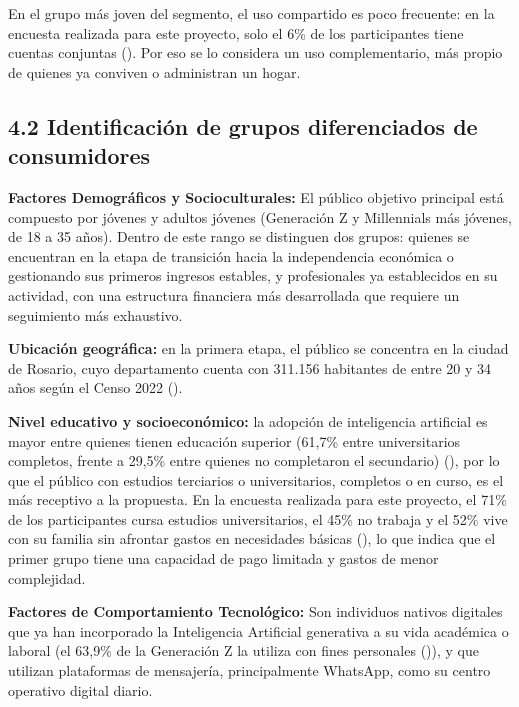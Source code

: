 En el grupo más joven del segmento, el uso compartido es poco frecuente:
en la encuesta realizada para este proyecto, solo el 6\% de los
participantes tiene cuentas conjuntas
(). Por eso se lo
considera un uso complementario, más propio de quienes ya conviven o
administran un hogar.

\subsection*{4.2 Identificación de grupos diferenciados de
consumidores}\label{identificaciuxf3n-de-grupos-diferenciados-de-consumidores}

\textbf{Factores Demográficos y Socioculturales:} El público objetivo
principal está compuesto por jóvenes y adultos jóvenes (Generación Z y
Millennials más jóvenes, de 18 a 35 años). Dentro de este rango se
distinguen dos grupos: quienes se encuentran en la etapa de transición
hacia la independencia económica o gestionando sus primeros ingresos
estables, y profesionales ya establecidos en su actividad, con una
estructura financiera más desarrollada que requiere un seguimiento más
exhaustivo.

\textbf{Ubicación geográfica:} en la primera etapa, el público se
concentra en la ciudad de Rosario, cuyo departamento cuenta con 311.156
habitantes de entre 20 y 34 años según el Censo 2022
().

\textbf{Nivel educativo y socioeconómico:} la adopción de inteligencia
artificial es mayor entre quienes tienen educación superior (61,7\%
entre universitarios completos, frente a 29,5\% entre quienes no
completaron el secundario) (), por lo que el público con estudios terciarios
o universitarios, completos o en curso, es el más receptivo a la
propuesta. En la encuesta realizada para este proyecto, el 71\% de los
participantes cursa estudios universitarios, el 45\% no trabaja y el
52\% vive con su familia sin afrontar gastos en necesidades básicas
(), lo que indica que
el primer grupo tiene una capacidad de pago limitada y gastos de menor
complejidad.

\textbf{Factores de Comportamiento Tecnológico:} Son individuos nativos
digitales que ya han incorporado la Inteligencia Artificial generativa a
su vida académica o laboral (el 63,9\% de la Generación Z la utiliza con
fines personales ()), y que utilizan plataformas de mensajería, principalmente
WhatsApp, como su centro operativo digital diario.

